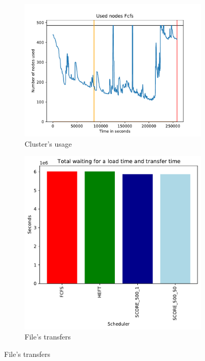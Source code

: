 \documentclass[a4paper]{article}
\begin{document}
\begin{figure}[H]\centering
\begin{subfigure}[b]{0.4\linewidth}\centering\includegraphics[width=1\linewidth]{MBSS/plot/2022-07-17->2022-07-18_V9271_Fcfs_Used_nodes_450_128_32_256_4_1024.pdf}\caption{Cluster's usage}\end{subfigure}
\begin{subfigure}[b]{0.4\linewidth}\centering\includegraphics[width=0.9\linewidth]{MBSS/plot/Results_FCFS_Score_Adaptative_Multiplier_2022-07-17->2022-07-18_V9271_Total_waiting_for_a_load_time_and_transfer_time_450_128_32_256_4_1024.pdf}\caption{File's transfers}\end{subfigure}

\end{figure}
\end{document}
